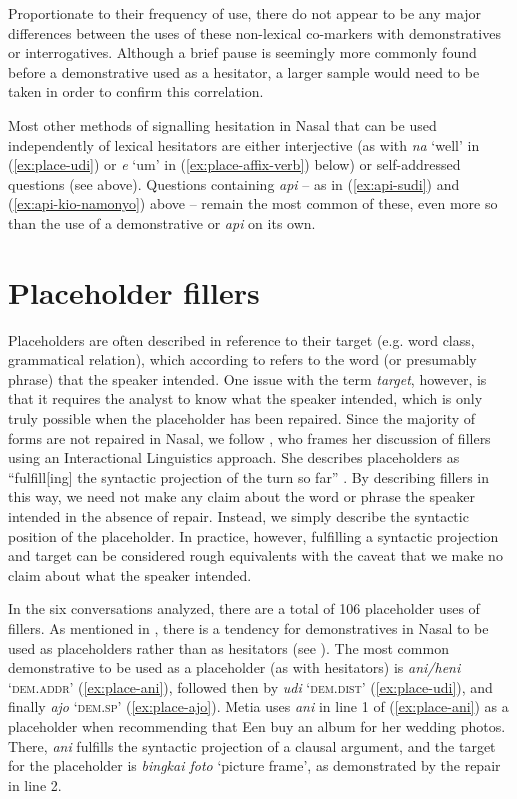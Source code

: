 \documentclass[output=paper,colorlinks,citecolor=brown
\ChapterDOI{10.5281/zenodo.15697585}
]{langscibook}
\begin{document}
Proportionate to their frequency of use, there do not appear to be any major differences between the uses of these non-lexical co-markers with demonstratives or interrogatives. Although a brief pause is seemingly more commonly found before a demonstrative used as a hesitator, a larger sample would need to be taken in order to confirm this correlation.

Most other methods of signalling hesitation in Nasal that can be used independently of lexical hesitators are either interjective (as with \textit{na} `well' in (\ref{ex:place-udi}) or \textit{e} `um' in (\ref{ex:place-affix-verb}) below) or self-addressed questions (see above). Questions containing \textit{api} -- as in (\ref{ex:api-sudi}) and (\ref{ex:api-kio-namonyo}) above -- remain the most common of these, even more so than the use of a demonstrative or \textit{api} on its own.

\section{Placeholder fillers}\label{sec:Placeholders}

Placeholders are often described in reference to their target (e.g. word class, grammatical relation), which according to \textcite{podlesskaya2010parameters} refers to the word (or presumably phrase) that the speaker intended. One issue with the term \textit{target}, however, is that it requires the analyst to know what the speaker intended, which is only truly possible when the placeholder has been repaired. Since the majority of forms are not repaired in Nasal, we follow \textcite{fox2010introduction}, who frames her discussion of fillers using an Interactional Linguistics approach. She describes placeholders as ``fulfill[ing] the syntactic projection of the turn so far'' \parencite[][2]{fox2010introduction}. By describing fillers in this way, we need not make any claim about the word or phrase the speaker intended in the absence of repair. Instead, we simply describe the syntactic position of the placeholder. In practice, however, fulfilling a syntactic projection and target can be considered rough equivalents with the caveat that we make no claim about what the speaker intended.

In the six conversations analyzed, there are a total of 106 placeholder uses of fillers. As mentioned in , there is a tendency for demonstratives in Nasal to be used as placeholders rather than as hesitators (see ). The most common demonstrative to be used as a placeholder (as with hesitators) is \textit{ani/heni} `\textsc{dem.addr}' (\ref{ex:place-ani}), followed then by \textit{udi} `\textsc{dem.dist}' (\ref{ex:place-udi}), and finally \textit{ajo} `\textsc{dem.sp}' (\ref{ex:place-ajo}). Metia uses \textit{ani} in line 1 of (\ref{ex:place-ani}) as a placeholder when recommending that Een buy an album for her wedding photos. There, \textit{ani} fulfills the syntactic projection of a clausal argument, and the target for the placeholder is \textit{bingkai foto} `picture frame', as demonstrated by the repair in line 2.
\end{document}
